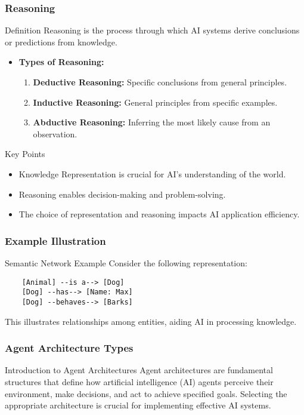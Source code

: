 \documentclass[aspectratio=169]{beamer}
\begin{document}
\begin{frame}[fragile]
    \frametitle{Reasoning}
    \begin{block}{Definition}
        Reasoning is the process through which AI systems derive conclusions or predictions from knowledge.
    \end{block}
    \begin{itemize}
        \item \textbf{Types of Reasoning:}
        \begin{enumerate}
            \item \textbf{Deductive Reasoning:} Specific conclusions from general principles.
            \item \textbf{Inductive Reasoning:} General principles from specific examples.
            \item \textbf{Abductive Reasoning:} Inferring the most likely cause from an observation.
        \end{enumerate}
    \end{itemize}
    
    \begin{block}{Key Points}
        \begin{itemize}
            \item Knowledge Representation is crucial for AI's understanding of the world.
            \item Reasoning enables decision-making and problem-solving.
            \item The choice of representation and reasoning impacts AI application efficiency.
        \end{itemize}
    \end{block}
\end{frame}

\begin{frame}[fragile]
    \frametitle{Example Illustration}
    \begin{block}{Semantic Network Example}
    Consider the following representation:
    \begin{lstlisting}
    [Animal] --is a--> [Dog]
    [Dog] --has--> [Name: Max]
    [Dog] --behaves--> [Barks]
    \end{lstlisting}
    This illustrates relationships among entities, aiding AI in processing knowledge.
    \end{block}
\end{frame}

\begin{frame}[fragile]
    \frametitle{Agent Architecture Types}
    \begin{block}{Introduction to Agent Architectures}
        Agent architectures are fundamental structures that define how artificial intelligence (AI) agents perceive their environment, make decisions, and act to achieve specified goals. Selecting the appropriate architecture is crucial for implementing effective AI systems.
    \end{block}
\end{frame}
\end{document}
